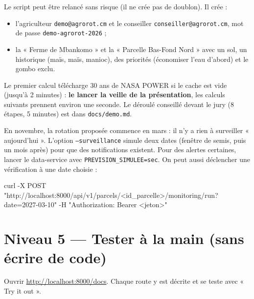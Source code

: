 \documentclass[11pt,a4paper]{article}
\begin{document}
Le script peut être relancé sans risque (il ne crée pas de doublon). Il crée :
\begin{itemize}
\item l'agriculteur \texttt{demo@agrorot.cm} et le conseiller \texttt{conseiller@agrorot.cm}, mot de passe
\texttt{demo-agrorot-2026} ;
\item la « Ferme de Mbankomo » et la « Parcelle Bas-Fond Nord » avec un sol, un historique (maïs, maïs, manioc), des
priorités (économiser l'eau d'abord) et le gombo exclu.
\end{itemize}

Le premier calcul télécharge 30 ans de NASA POWER si le cache est vide (jusqu'à 2 minutes) : \textbf{le lancer la
veille de la présentation}, les calculs suivants prennent environ une seconde. Le déroulé conseillé devant le jury
(8 étapes, 5 minutes) est dans \texttt{docs/demo.md}.

\begin{attention}
En novembre, la rotation proposée commence en mars : il n'y a rien à surveiller « aujourd'hui ». L'option
\texttt{--surveillance} simule deux dates (fenêtre de semis, puis un mois après) pour que des notifications existent.
Pour des alertes certaines, lancer le data-service avec \texttt{PREVISION\_SIMULEE=sec}. On peut aussi déclencher
une vérification à une date choisie :
\begin{code}
curl -X POST "http://localhost:8000/api/v1/parcels/<id_parcelle>/monitoring/run?date=2027-03-10" -H "Authorization: Bearer <jeton>"
\end{code}
\end{attention}

\section{Niveau 5 — Tester à la main (sans écrire de code)}

Ouvrir \url{http://localhost:8000/docs}. Chaque route y est décrite et se teste avec « Try it out ».
\end{document}
